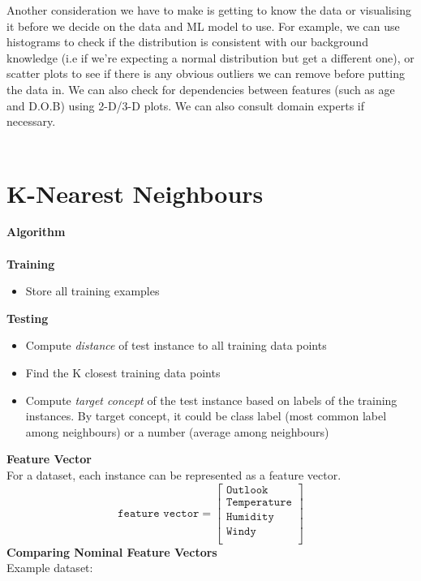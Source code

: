 \documentclass[a4paper,10pt]{article}
\begin{document}
Another consideration we have to make is getting to know the data or visualising it before we decide on the data and ML model to use. For example, we can use histograms to check if the distribution is consistent with our background knowledge (i.e if we're expecting a normal distribution but get a different one), or scatter plots to see if there is any obvious outliers we can remove before putting the data in. We can also check for dependencies between features (such as age and D.O.B) using 2-D/3-D plots. We can also consult domain experts if necessary. \\\\
\newpage
\section*{K-Nearest Neighbours}
\textcolor{Periwinkle}{\textbf{Algorithm}}\\\\
\textbf{Training}
\begin{itemize}
	\item Store all training examples
\end{itemize}
\textbf{Testing}
\begin{itemize}
	\item Compute \emph{distance} of test instance to all training data points 
	\item Find the K closest training data points 
	\item Compute \emph{target concept} of the test instance based on labels of the training instances. By target concept, it could be class label (most common label among neighbours) or a number (average among neighbours)
\end{itemize}
\textcolor{Periwinkle}{\textbf{Feature Vector}}\\
For a dataset, each instance can be represented as a feature vector. \\
\begin{equation*}
	\texttt{feature vector} = 
	\begin{bmatrix}
		\texttt{Outlook}\\
		\texttt{Temperature}\\
		\texttt{Humidity}\\
		\texttt{Windy}\\
	\end{bmatrix}	
\end{equation*}
\textcolor{Periwinkle}{\textbf{Comparing Nominal Feature Vectors}}\\
\noindent Example dataset:
\end{document}
